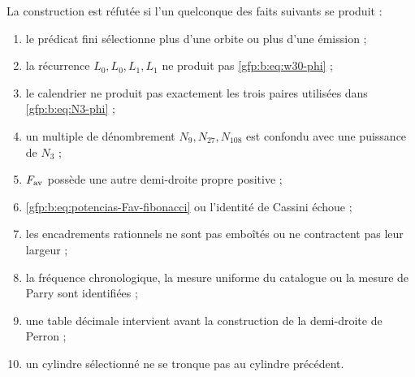\begin{remark}
La construction est réfutée si l’un quelconque des faits
suivants se produit :
\begin{enumerate}
 \setlength{\itemsep}{0.15\baselineskip}
 \item le prédicat fini sélectionne plus d’une orbite ou plus d’une émission ;
 \item la récurrence \(L_0,L_0,L_1,L_1\) ne produit pas
       \eqref{gfp:b:eq:w30-phi} ;
 \item le calendrier ne produit pas exactement les trois paires utilisées dans
       \eqref{gfp:b:eq:N3-phi} ;
 \item un multiple de dénombrement \(N_{9},N_{27},N_{108}\) est confondu avec une
       puissance de \(N_3\) ;
 \item \(F_{\rm av}\) possède une autre demi-droite propre positive ;
 \item \eqref{gfp:b:eq:potencias-Fav-fibonacci} ou l’identité de Cassini échoue ;
 \item les encadrements rationnels ne sont pas emboîtés ou ne contractent pas leur largeur ;
 \item la fréquence chronologique, la mesure uniforme du
       catalogue ou la mesure de Parry sont identifiées ;
 \item une table décimale intervient avant la construction de la demi-droite de Perron ;
 \item un cylindre sélectionné ne se tronque pas au cylindre précédent.
\end{enumerate}
\end{remark}
